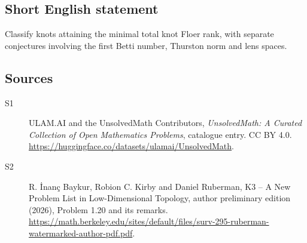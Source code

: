 \documentclass[11pt]{article}
\begin{document}
\subsection{Short English statement}
Classify knots attaining the minimal total knot Floer rank, with separate conjectures involving the first Betti number, Thurston norm and lens spaces.
\subsection{Sources}
\begin{description}
\item[\hypertarget{source:statement:1}{S1}] ULAM.AI and the UnsolvedMath Contributors, \emph{UnsolvedMath: A Curated Collection of Open Mathematics Problems}, catalogue entry. CC BY 4.0. \url{https://huggingface.co/datasets/ulamai/UnsolvedMath}.
\item[\hypertarget{source:statement:2}{S2}] R. \.{I}nan\c{c} Baykur, Robion C. Kirby and Daniel Ruberman, K3 -- A New Problem List in Low-Dimensional Topology, author preliminary edition (2026), Problem 1.20 and its remarks. \url{https://math.berkeley.edu/sites/default/files/surv-295-ruberman-watermarked-author-pdf.pdf}.
\end{description}
\label{end:statement}
\end{document}
